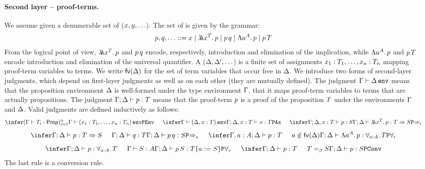 \paragraph{Second layer -- proof-terms.}
We assume given a denumerable set of  ($x,y,\hdots$).
The set of  is given by the grammar:
\[
  p,q,\hdots
       ::= x
      \mid \lambda\!\!\lambda{x^{T}}.\,p
      \mid p\,q
      \mid \Lambda{a^{A}}.\,p
      \mid p\,T
\]
From the logical point of view, $\lambda\!\!\lambda{x^{T}}.\,p$ and $p\,q$
encode, respectively, introduction and elimination of the implication,
while $\Lambda{a^{A}}.\,p$ and $p\,T$
encode introduction and elimination of the universal quantifier.
A  ($\Delta,\Delta',\hdots$) is a finite set of
assignments $x_1:T_1,\hdots,x_n:T_n$ mapping proof-term variables
to terms.
We write $\mathsf{fv}(\Delta)$ for the set of term variables that occur free in $\Delta$.
We introduce two forms of second-layer judgments,
which depend on first-layer judgments
as well as on each other (\ie they are mutually defined).
The judgment $\Gamma\vdash\Delta\,\texttt{env}$ means that the proposition environment
$\Delta$ is well-formed under the type environment $\Gamma$,
\ie that it maps proof-term variables to terms that are actually
propositions.
The judgment $\Gamma;\Delta\vdash p:T$
means that the proof-term $p$ is a proof of the proposition $T$
under the environments $\Gamma$ and $\Delta$.
Valid judgments are defined inductively as follows:
\[
  \indrule{\rulePEnv}{
    (\tjudg{\tenv}{\ttm_i}{\Prop})_{i=1}^{n}
  }{
    \pjudgenv{\tenv}{(\pvar_1:\ttm_1,\hdots,\pvar_n:\ttm_n)}
  }
  \HS
  \indrule{\rulePAx}{
    \pjudgenv{\tenv}{(\penv,\pvar:\ttm)}
  }{
    \pjudg{\tenv}{\penv,\pvar:\ttm}{\pvar}{\ttm}
  }
  \HS
  \indrule{\rulePImpI}{
    \pjudg{\tenv}{\penv,\pvar:\ttm}{\ptm}{\ttmtwo}
  }{
    \pjudg{\tenv}{\penv}{\plamt{\pvar}{\ttm}{\ptm}}{\ttm\imp\ttmtwo}
  }
\]
\[
  \indrule{\rulePImpE}{
    \pjudg{\tenv}{\penv}{\ptm}{\ttm\imp\ttmtwo}
    \HS
    \pjudg{\tenv}{\penv}{\ptmtwo}{\ttm}
  }{
    \pjudg{\tenv}{\penv}{\ptm\,\ptmtwo}{\ttmtwo}
  }
  \HS
  \indrule{\rulePAllI}{
    \pjudg{\tenv,\tvar:\typ}{\penv}{\ptm}{\ttm}
    \HS
    \tvar\notin\fv{\penv}
  }{
    \pjudg{\tenv}{\penv}{\palli{\tvar}{\typ}{\ptm}}{\all{\tvar}{\typ}{\ttm}}
  }
\]
\[
  \indrule{\rulePAllE}{
    \pjudg{\tenv}{\penv}{\ptm}{\all{\tvar}{\typ}{\ttm}}
    \HS
    \tjudg{\tenv}{\ttmtwo}{\typ}
  }{
    \pjudg{\tenv}{\penv}{\ptm\,\ttmtwo}{\ttm\sub{\tvar}{\ttmtwo}}
  }
  \HS
  \indrule{\rulePConv}{
    \pjudg{\tenv}{\penv}{\ptm}{\ttm}
    \HS
    \ttm \eqbeta \ttmtwo
  }{
    \pjudg{\tenv}{\penv}{\ptm}{\ttmtwo}
  }
\]
The last rule is a conversion rule.

